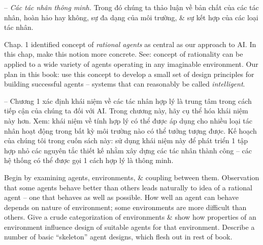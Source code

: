 \documentclass{article}
\begin{document}
\begin{itemize}
\begin{itemize}
		-- {\it Các tác nhân thông minh.} Trong đó chúng ta thảo luận về bản chất của các tác nhân, hoàn hảo hay không, sự đa dạng của môi trường, \& sự kết hợp của các loại tác nhân.

		Chap. 1 identified concept of {\it rational agents} as central as our approach to AI. In this chap, make this notion more concrete. See: concept of rationality can be applied to a wide variety of agents operating in any imaginable environment. Our plan in this book: use this concept to develop a small set of design principles for building successful agents -- systems that can reasonably be called {\it intelligent}.

		-- Chương 1 xác định khái niệm về các tác nhân hợp lý là trung tâm trong cách tiếp cận của chúng ta đối với AI. Trong chương này, hãy cụ thể hóa khái niệm này hơn. Xem: khái niệm về tính hợp lý có thể được áp dụng cho nhiều loại tác nhân hoạt động trong bất kỳ môi trường nào có thể tưởng tượng được. Kế hoạch của chúng tôi trong cuốn sách này: sử dụng khái niệm này để phát triển 1 tập hợp nhỏ các nguyên tắc thiết kế nhằm xây dựng các tác nhân thành công -- các hệ thống có thể được gọi 1 cách hợp lý là thông minh.

		Begin by examining agents, environments, \& coupling between them. Observation that some agents behave better than others leads naturally to idea of a rational agent -- one that behaves as well as possible. How well an agent can behave depends on nature of environment; some environments are more difficult than others. Give a crude categorization of environments \& show how properties of an environment influence design of suitable agents for that environment. Describe a number of basic ``skeleton'' agent designs, which flesh out in rest of book.


\end{itemize}
\end{itemize}
\end{document}
